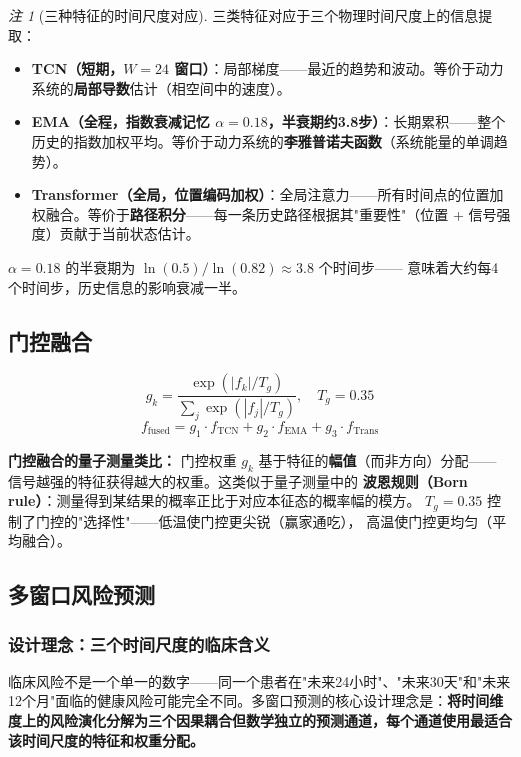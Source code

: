 \documentclass[11pt,a4paper]{ctexart}
\theoremstyle{remark}
\newtheorem{remark}{注}[section]
\begin{document}
\begin{remark}[三种特征的时间尺度对应]
三类特征对应于三个物理时间尺度上的信息提取：
\begin{itemize}[nosep]
\item \textbf{TCN（短期，$W=24$ 窗口）}：局部梯度——最近的趋势和波动。等价于动力系统的\textbf{局部导数}估计（相空间中的速度）。
\item \textbf{EMA（全程，指数衰减记忆 $\alpha=0.18$，半衰期约3.8步）}：长期累积——整个历史的指数加权平均。等价于动力系统的\textbf{李雅普诺夫函数}（系统能量的单调趋势）。
\item \textbf{Transformer（全局，位置编码加权）}：全局注意力——所有时间点的位置加权融合。等价于\textbf{路径积分}——每一条历史路径根据其"重要性"（位置 + 信号强度）贡献于当前状态估计。
\end{itemize}
$\alpha=0.18$ 的半衰期为 $\ln(0.5)/\ln(0.82) \approx 3.8$ 个时间步——
意味着大约每4个时间步，历史信息的影响衰减一半。
\end{remark}

\subsection{门控融合}

\begin{equation}
g_k = \frac{\exp(|f_k| / T_g)}{\sum_j \exp(|f_j| / T_g)}, \quad T_g = 0.35
\end{equation}
\begin{equation}
f_{\text{fused}} = g_1 \cdot f_{\text{TCN}} + g_2 \cdot f_{\text{EMA}} + g_3 \cdot f_{\text{Trans}}
\end{equation}

\textbf{门控融合的量子测量类比：} 门控权重 $g_k$ 基于特征的\textbf{幅值}（而非方向）分配——
信号越强的特征获得越大的权重。这类似于量子测量中的
\textbf{波恩规则（Born rule）}：测量得到某结果的概率正比于对应本征态的概率幅的模方。
$T_g = 0.35$ 控制了门控的"选择性"——低温使门控更尖锐（赢家通吃），
高温使门控更均匀（平均融合）。

\subsection{多窗口风险预测}

\subsubsection{设计理念：三个时间尺度的临床含义}

临床风险不是一个单一的数字——同一个患者在"未来24小时"、"未来30天"和"未来12个月"面临的健康风险可能完全不同。多窗口预测的核心设计理念是：\textbf{将时间维度上的风险演化分解为三个因果耦合但数学独立的预测通道，每个通道使用最适合该时间尺度的特征和权重分配。}
\end{document}
